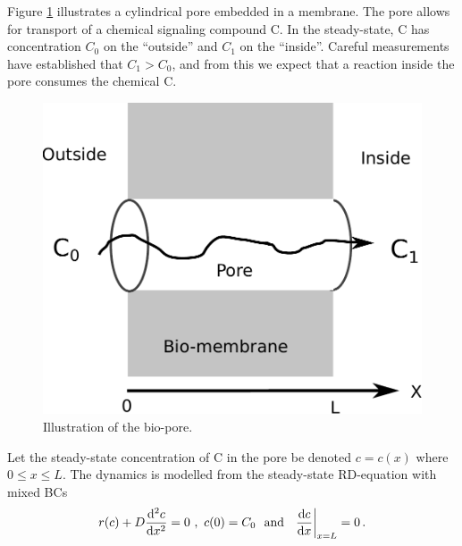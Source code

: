\begin{exerciseregion}
\begin{exploration}
  Figure \ref{fig:biopore} illustrates a cylindrical pore embedded in a
  membrane. The pore allows for transport of a chemical signaling compound
  C. In the steady-state, C has concentration $C_0$ on the ``outside'' and $C_1$
  on the ``inside''. Careful measurements have established that $C_1 > C_0$, and
  from this we expect that a reaction inside the pore consumes the chemical
  C. 
	\begin{figure}[h!]
    \begin{center}
      \includegraphics[scale=0.4]{figs/biopore.pdf}
      \caption{\label{fig:biopore}
        Illustration of the bio-pore.
      }
    \end{center}
  \end{figure}
  
  Let the steady-state concentration of C in the pore be denoted $c=c(x)$ where
  $0 \leq x \leq L$. The dynamics is modelled from the steady-state RD-equation
  with mixed BCs
  \begin{equation}
    \label{eq:rdss}
    r(c) + D \frac{\mathrm{d}^2c}{\mathrm{d} x^2} = 0 \ , \ c(0)=C_0 \ \ \text{and} \ \
    \left. \frac{\mathrm{d} c}{\mathrm{d} x}\right|_{x=L} =0 \, .
  \end{equation}
  

\end{exploration}
\end{exerciseregion}
